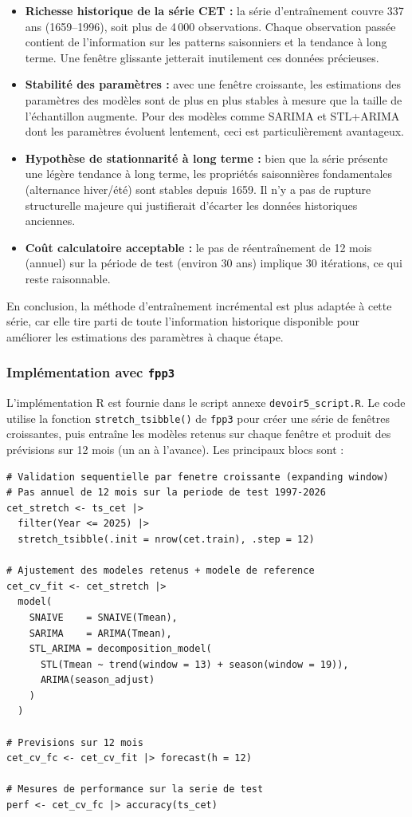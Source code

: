 \documentclass[12pt,a4paper]{article}
\begin{document}
\begin{itemize}
    \item \textbf{Richesse historique de la série CET :} la série d'entraînement couvre 337 ans (1659--1996), soit plus de 4\,000 observations. Chaque observation passée contient de l'information sur les patterns saisonniers et la tendance à long terme. Une fenêtre glissante jetterait inutilement ces données précieuses.
    \item \textbf{Stabilité des paramètres :} avec une fenêtre croissante, les estimations des paramètres des modèles sont de plus en plus stables à mesure que la taille de l'échantillon augmente. Pour des modèles comme SARIMA et STL+ARIMA dont les paramètres évoluent lentement, ceci est particulièrement avantageux.
    \item \textbf{Hypothèse de stationnarité à long terme :} bien que la série présente une légère tendance à long terme, les propriétés saisonnières fondamentales (alternance hiver/été) sont stables depuis 1659. Il n'y a pas de rupture structurelle majeure qui justifierait d'écarter les données historiques anciennes.
    \item \textbf{Coût calculatoire acceptable :} le pas de réentraînement de 12 mois (annuel) sur la période de test (environ 30 ans) implique 30 itérations, ce qui reste raisonnable.
\end{itemize}

En conclusion, la méthode d'entraînement incrémental est plus adaptée à cette série, car elle tire parti de toute l'information historique disponible pour améliorer les estimations des paramètres à chaque étape.

\subsubsection{Implémentation avec \texttt{fpp3}}

L'implémentation R est fournie dans le script annexe \texttt{devoir5\_script.R}. Le code utilise la fonction \texttt{stretch\_tsibble()} de \texttt{fpp3} pour créer une série de fenêtres croissantes, puis entraîne les modèles retenus sur chaque fenêtre et produit des prévisions sur 12 mois (un an à l'avance). Les principaux blocs sont :

\begin{lstlisting}
# Validation sequentielle par fenetre croissante (expanding window)
# Pas annuel de 12 mois sur la periode de test 1997-2026
cet_stretch <- ts_cet |>
  filter(Year <= 2025) |>
  stretch_tsibble(.init = nrow(cet.train), .step = 12)

# Ajustement des modeles retenus + modele de reference
cet_cv_fit <- cet_stretch |>
  model(
    SNAIVE    = SNAIVE(Tmean),
    SARIMA    = ARIMA(Tmean),
    STL_ARIMA = decomposition_model(
      STL(Tmean ~ trend(window = 13) + season(window = 19)),
      ARIMA(season_adjust)
    )
  )

# Previsions sur 12 mois
cet_cv_fc <- cet_cv_fit |> forecast(h = 12)

# Mesures de performance sur la serie de test
perf <- cet_cv_fc |> accuracy(ts_cet)
\end{lstlisting}
\end{document}
